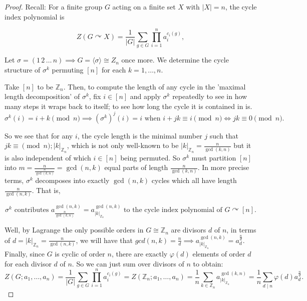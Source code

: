 \documentclass[addpoints,10pt]{exam}
\theoremstyle{plain}
\theoremstyle{definition}
\theoremstyle{plain}
\theoremstyle{plain}
\theoremstyle{definition}
\newcommand{\ZZ}{\ensuremath{\mathbb{Z}}}
\begin{document}
\begin{proof} Recall: For a finite group $G$ acting on a finite set $X$ with $|X|=n$, the cycle index polynomial is

\[
Z(G \curvearrowright X)
=
\frac{1}{|G|}
\sum_{g\in G}
\prod_{i=1}^{n} a_i^{c_i(g)},
\]

Let $\sigma = (1\,2\,\dots\,n)\implies G=\langle \sigma\rangle \cong Z_{n}$ once more. We determine the cycle structure of $\sigma^k$ permuting $[n]$ for each $k=1,\hdots, n$.

Take $[n]$ to be $\mathbb{Z}_n$. Then, to compute the length of any cycle in the 'maximal length decomposition' of $\sigma^{k}$, fix $i\in [n]$ and apply $\sigma^{k}$ repeatedly to see in how many steps it wraps back to itself; to see how long the cycle it is contained in is.
\[
\sigma^{k}(i)=i+k\pmod n\implies (\sigma^{k})^{j}(i)=i\text{ when }i+jk\equiv i\pmod n\iff jk\equiv 0\pmod n. 
\]

So we see that for any $i$, the cycle length is the minimal number $j$ such that $jk\equiv \pmod n;|k|_{\ZZ_{n}}$, which is not only well-known to be $|k|_{\ZZ_{n}}=\frac{n}{\gcd(k,n)}$ but it is also independent of which $i\in [n]$ being permuted. So $\sigma^{k}$ must partition $[n]$ into $m=\frac{n}{\frac{n}{\gcd(k,n)}}=\gcd(n,k)$ equal parts of length $\frac{n}{\gcd(k,n)}$. In more precise terms, $\sigma^{k}$ decomposes into exactly $\gcd(n,k)$ cycles which all have length $\frac{n}{\gcd(n,k)}$. That is,

\[
\sigma^{k}\text{ contributes }a_{\frac{n}{\gcd(k,n)}}^{\gcd(n,k)}=a_{|k|_{\ZZ_{n}}}^{\gcd(n,k)}\text{ to the cycle index polynomial of }G\curvearrowright [n].
\]

Well, by Lagrange the only possible orders in $G\cong \ZZ_{n}$ are divisors $d$ of $n$, in terms of $d=|k|_{\ZZ_{n}}=\frac{n}{\gcd(n,k)}$, we will have that $gcd(n,k)=\frac{n}{d}\implies a_{|k|_{\ZZ_{n}}}^{\gcd(n,k)}=a_{d}^{\frac{n}{d}}$. Finally, since $G$ is cyclic of order $n$, there are exactly $\varphi(d)$ elements of order $d$ for each divisor $d$ of $n$. So we can just sum over divisors of $n$ to obtain:
$$
Z(G;a_{1},\hdots,a_{n})
=\frac{1}{|G|}
\sum_{g\in G}
\prod_{i=1}^{n} a_i^{c_i(g)}=Z(\ZZ_{n}; a_{1},\hdots,a_{n})
=\frac{1}{n}
\sum_{k\in \ZZ_{n}}
a_{|k|_{\ZZ_{n}}}^{\gcd(k,n)}=\frac{1}{n}
\sum_{d\mid n}
\varphi(d) a_d^{\frac{n}{d}}.
$$
\end{proof}

\newpage
\setcounter{thm}{10}
\renewcommand{\thethm}{\arabic{thm}(a)}
\end{document}
